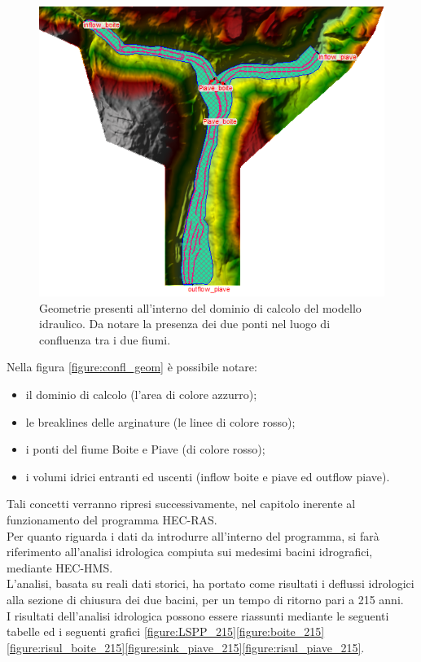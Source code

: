 \begin{figure}[htb] \centering
\includegraphics[scale=0.7]{immagini/confl_geom.PNG}
\caption{Geometrie presenti all'interno del dominio di calcolo del modello idraulico. Da notare la presenza dei due ponti nel luogo di confluenza tra i due fiumi.}
\label{figure:confl_geom}    
\end{figure}
Nella figura \eqref{figure:confl_geom} è possibile notare:
\begin{itemize}
    \item il dominio di calcolo (l'area di colore azzurro);
    \item le breaklines delle arginature (le linee di colore rosso);
    \item i ponti del fiume Boite e Piave (di colore rosso);
    \item i volumi idrici entranti ed uscenti (inflow boite e piave ed outflow piave).
\end{itemize}
Tali concetti verranno ripresi successivamente, nel capitolo inerente al funzionamento del programma HEC-RAS.\\
Per quanto riguarda i dati da introdurre all'interno del programma, si farà riferimento all'analisi idrologica compiuta sui medesimi bacini idrografici, mediante HEC-HMS.\\
L'analisi, basata su reali dati storici, ha portato come risultati i deflussi idrologici alla sezione di chiusura dei due bacini, per un tempo di ritorno pari a 215 anni.\\
I risultati dell'analisi idrologica possono essere riassunti mediante le seguenti tabelle ed i seguenti grafici \eqref{figure:LSPP_215}\eqref{figure:boite_215}\eqref{figure:risul_boite_215}\eqref{figure:sink_piave_215}\eqref{figure:risul_piave_215}.


